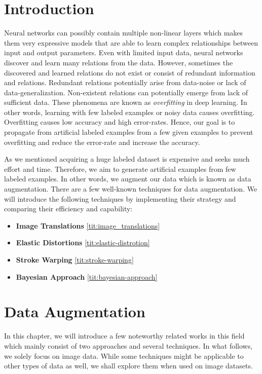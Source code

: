 \chapter{Introduction}
Neural networks can possibly contain multiple non-linear layers which makes them very expressive models
that are able to learn complex relationships between input and output parameters. Even with limited
input data, neural networks discover and learn many relations from the data. However, sometimes the
discovered and learned relations do not exist or  consist of redundant information and
relations. Redundant relations potentially arise from data-noise or lack of data-generalization.
Non-existent relations can potentially emerge from lack of sufficient data. These phenomena are known as
\textit{overfitting} in deep learning. In other words, learning with few labeled examples or noisy
data causes overfitting. Overfitting causes low accuracy and high error-rates. Hence, our goal is to
propagate from artificial labeled examples from a few given examples to prevent overfitting and reduce the error-rate and increase
the accuracy.

As we mentioned acquiring a huge labeled dataset is expensive and seeks much effort and time.
Therefore, we aim to generate artificial examples from few labeled examples. In other words, we
augment our data which is known as data augmentation. There are a few well-known techniques for data
augmentation. We will introduce the following techniques by implementing their strategy and
comparing their efficiency and capability:
\begin{itemize}
  \item \textbf{Image Translations} \ref{tit:image_translations}
  \item \textbf{Elastic Distortions} \ref{tit:elastic-distrotion}
  \item \textbf{Stroke Warping} \ref{tit:stroke-warping}
  \item \textbf{Bayesian Approach} \ref{tit:bayesian-approach}
\end{itemize}


\chapter{Data Augmentation}
\label{tit:data-augmentation}
In this chapter, we will introduce a few noteworthy related works in this field which mainly consist
of two approaches and several techniques.
In what follows, we solely focus on image data.  While some techniques might be applicable to other
types of data as well, we shall explore them when used on image datasets.

